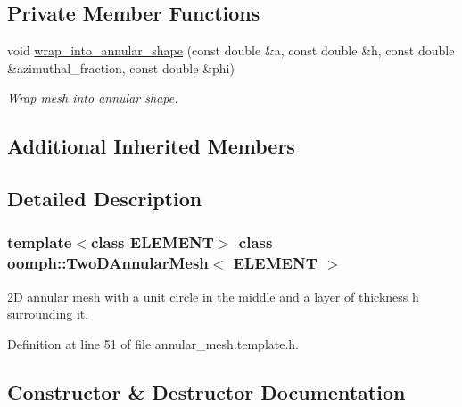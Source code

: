 \subsection*{Private Member Functions}
\begin{DoxyCompactItemize}
\item 
void \hyperlink{classoomph_1_1TwoDAnnularMesh_adcf4ce1aefcce7a773c66ff0f496df9e}{wrap\+\_\+into\+\_\+annular\+\_\+shape} (const double \&a, const double \&h, const double \&azimuthal\+\_\+fraction, const double \&phi)
\begin{DoxyCompactList}\small\item\em Wrap mesh into annular shape. \end{DoxyCompactList}\end{DoxyCompactItemize}
\subsection*{Additional Inherited Members}


\subsection{Detailed Description}
\subsubsection*{template$<$class E\+L\+E\+M\+E\+NT$>$\newline
class oomph\+::\+Two\+D\+Annular\+Mesh$<$ E\+L\+E\+M\+E\+N\+T $>$}

2D annular mesh with a unit circle in the middle and a layer of thickness h surrounding it. 

Definition at line 51 of file annular\+\_\+mesh.\+template.\+h.



\subsection{Constructor \& Destructor Documentation}
\mbox{\label{classoomph_1_1TwoDAnnularMesh_a4bb40bf0a81db8dc3493735007626c3b}} 
